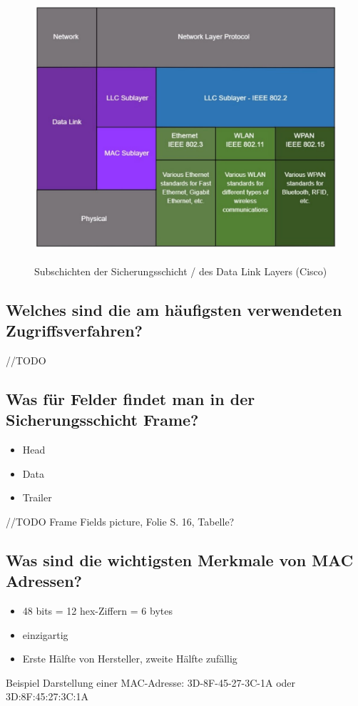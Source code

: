 \begin{figure}[H]
    \begin{center}
    \label{pic:DataLinkLayer_LLC_MAC}
    \includegraphics[width=\textwidth]{images/DLL_Sublayers.jpg}
    \caption{Subschichten der Sicherungsschicht / des Data Link Layers (\textsuperscript{\textcopyright}Cisco)}
    \end{center}
\end{figure}

\subsection*{Welches sind die am häufigsten verwendeten Zugriffsverfahren?}
//TODO

\subsection*{Was für Felder findet man in der Sicherungsschicht Frame?}
\begin{itemize}
    \item Head
    \item Data
    \item Trailer
\end{itemize}
//TODO Frame Fields picture, Folie S. 16, Tabelle?

\subsection*{Was sind die wichtigsten Merkmale von MAC Adressen?}
\begin{itemize}
    \item 48 bits = 12 hex-Ziffern = 6 bytes
    \item einzigartig
    \item Erste Hälfte von Hersteller, zweite Hälfte zufällig
\end{itemize}
Beispiel Darstellung einer MAC-Adresse: 3D-8F-45-27-3C-1A oder 3D:8F:45:27:3C:1A

